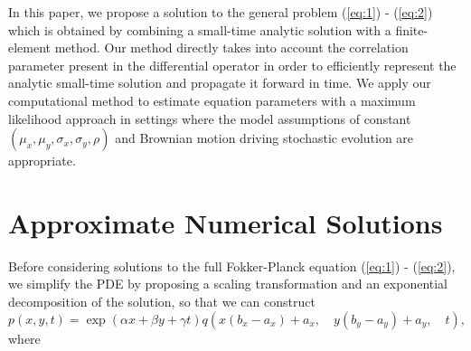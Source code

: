 \documentclass[10pt]{article}
\begin{document}
In this paper, we propose a solution to the general problem
(\ref{eq:1}) - (\ref{eq:2}) which is obtained by combining a
small-time analytic solution with a finite-element method. Our method
directly takes into account the correlation parameter present in the
differential operator in order to efficiently represent the analytic
small-time solution and propagate it forward in time. We apply our
computational method to estimate equation parameters with a maximum
likelihood approach in settings where the model assumptions of
constant $(\mu_x, \mu_y, \sigma_x, \sigma_y, \rho)$ and Brownian
motion driving stochastic evolution are appropriate.


\section{Approximate Numerical Solutions}
Before considering solutions to the full Fokker-Planck equation
(\ref{eq:1}) - (\ref{eq:2}), we simplify the PDE by proposing a
scaling transformation and an exponential decomposition of the
solution, so that we can construct
\[
  p(x,y,t) = \exp(\alpha x + \beta y + \gamma t) q\left( x(b_x - a_x) + a_x, \quad y(b_y - a_y) + a_y, \quad t \right),
\]
where
\end{document}
